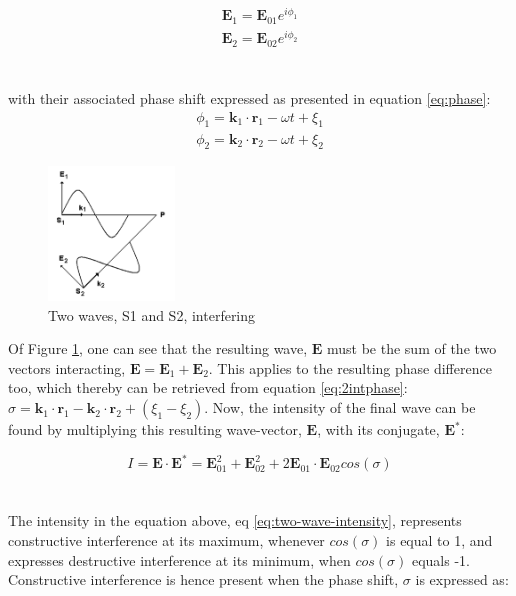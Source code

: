 \begin{equation}
    \begin{split}
    \textbf{E}_1 = \textbf{E}_{01} e^{i \phi_1}\\ %
    \textbf{E}_2 = \textbf{E}_{02} e^{i \phi_2}
    \end{split}
    \label{eq:2int}
\end{equation}
\\\\
with their associated phase shift expressed as presented in equation \ref{eq:phase}:
\begin{equation}
    \begin{split}
    \phi_1 = \textbf{k}_1\cdot \textbf{r}_1 - \omega t + \xi_1\\
    \phi_2 = \textbf{k}_2\cdot \textbf{r}_2 - \omega t + \xi_2
    \end{split}
    \label{eq:2intphase}
\end{equation}
\begin{figure}[h]
  \centering
    \includegraphics[width=0.3\textwidth]{Images/theory/interference.png}
    \caption{Two waves, S1 and S2, interfering}
    \label{fig:interference}
\end{figure}
Of Figure \ref{fig:interference}, one can see that the resulting wave, $\textbf{E}$ must be the sum of the two vectors interacting, $\textbf{E} = \textbf{E}_1 + \textbf{E}_2$. This applies to the resulting phase difference too, which thereby can be retrieved from equation \ref{eq:2intphase}: $\sigma = \textbf{k}_1\cdot \textbf{r}_1 - \textbf{k}_2\cdot \textbf{r}_2 + (\xi_1 - \xi_2)$. Now, the intensity of the final wave can be found by multiplying this resulting wave-vector, $\textbf{E}$, with its conjugate, $\textbf{E}^*$: 

\begin{equation}
    I = \textbf{E} \cdot \textbf{E}^* = \textbf{E}_{01}^2 + \textbf{E}_{02}^2 + 2\textbf{E}_{01}\cdot \textbf{E}_{02} cos(\sigma)
    \label{eq:two-wave-intensity}
\end{equation}
\\\\
The intensity in the equation above, eq \ref{eq:two-wave-intensity}, represents constructive interference at its maximum, whenever $cos(\sigma)$ is equal to 1, and expresses destructive interference at its minimum, when $cos(\sigma)$ equals -1. Constructive interference is hence present when the phase shift, $\sigma$ is expressed as:

